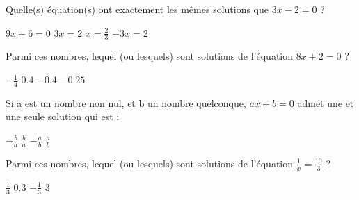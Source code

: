 \documentclass[10pt,a4paper]{exam}
\begin{document}
\vspace{10 mm}
 
Quelle(s) équation(s) ont exactement les mêmes solutions que $3x-2=0$ ?

\begin{oneparcheckboxes}
   \choice $9x+6=0$
   \choice $3x = 2$
   \choice $x= \frac{2}{3}$
   \choice $-3x = 2$
\end{oneparcheckboxes}
 
\vspace{10 mm}

Parmi ces nombres, lequel (ou lesquels) sont solutions de l'équation   $8x+2=0$ ?


\begin{oneparcheckboxes}
   \choice $-\frac{1}{4}$
   \choice $0.4$
   \choice $-0.4$
   \choice $-0.25$
\end{oneparcheckboxes}
 
\vspace{10 mm}

Si a est un nombre non nul, et b un nombre quelconque, $ax+b=0$  admet une et une seule solution qui est :

\begin{oneparcheckboxes}
   \choice $-\frac{b}{a}$
   \choice $\frac{b}{a}$
   \choice $-\frac{a}{b}$
   \choice $\frac{a}{b}$
\end{oneparcheckboxes}
 
\vspace{10 mm}
Parmi ces nombres, lequel (ou lesquels) sont solutions de l'équation   $\frac{1}{x}=\frac{10}{3}$ ?

\begin{oneparcheckboxes}
   \choice $\frac{1}{3}$
   \choice $0.3$
   \choice $-\frac{1}{3}$
   \choice $3$
\end{oneparcheckboxes}

 
 
\end{document}

